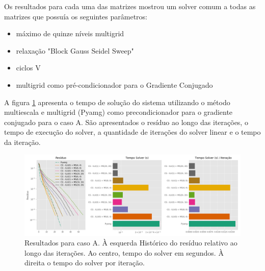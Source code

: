 Os resultados para cada uma das matrizes mostrou um solver comum a todas as matrizes que possuía os seguintes parâmetros:

\begin{itemize}
    \item máximo de quinze níveis multigrid
    \item relaxação "Block Gauss Seidel Sweep" 
    \item ciclos V
    \item multigrid como pré-condicionador para o Gradiente Conjugado
\end{itemize}

A figura \ref{fig:reservatorio100x100_1} apresenta o tempo de solução do sistema utilizando o método multiescala e multigrid (Pyamg) como precondicionador para o gradiente conjugado para o caso A. São apresentados o resíduo ao longo das iterações, o tempo de execução do solver, a quantidade de iterações do solver linear e o tempo da iteração.

\begin{figure}[!htbp]
\centering
\includegraphics[width=\textwidth]{chap08/figs/reservatorio100x100_1.png}
\caption{Resultados para caso A. À esquerda Histórico do resíduo relativo ao longo das iterações. 
Ao centro, tempo do solver em segundos. À direita o tempo do solver por iteração. }
\label{fig:reservatorio100x100_1}
\end{figure}

